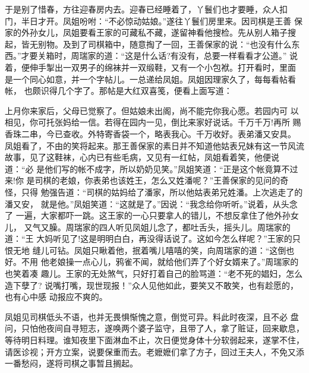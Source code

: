 于是别了惜春，方往迎春房内去。迎春已经睡着了，丫鬟们也才要睡，众人扣
门，半日才开。凤姐吩咐：“不必惊动姑娘。”遂往丫鬟们房里来。因司棋是王善
保家的外孙女儿，凤姐要看王家的可藏私不藏，遂留神看他搜检。先从别人箱子搜
起，皆无别物。及到了司棋箱中，随意掏了一回，王善保家的说：“也没有什么东
西。”才要关箱时，周瑞家的道：“这是什么话?有没有，总要一样看看才公道。”
说着，便伸手掣出一双男子的绵袜并一双缎鞋，又有一个小包袱。打开看时，里面
是一个同心如意，并一个字帖儿。一总递给凤姐。凤姐因理家久了，每每看帖看帐，
也颇识得几个字了。那帖是大红双喜笺，便看上面写道：

上月你来家后，父母已觉察了。但姑娘未出阁，尚不能完你我心愿。若园内可
以相见，你可托张妈给一信。若得在园内一见，倒比来家好说话。千万千万!再所
赐香珠二串，今已查收。外特寄香袋一个，略表我心。千万收好。表弟潘又安具。
凤姐看了，不由的笑将起来。那王善保家的素日并不知道他姑表兄妹有这一节风流
故事，见了这鞋袜，心内已有些毛病，又见有一红帖，凤姐看着笑，他便说道：“必
是他们写的帐不成字，所以奶奶见笑。”凤姐笑道：“正是这个帐竟算不过来!你
是司棋的老娘，你表弟也该姓王，怎么又姓潘呢？”王善保家的见问的奇怪，只得
勉强告道：“司棋的姑妈给了潘家，所以他姑表弟兄姓潘。上次逃走了的潘又安，
就是他。”凤姐笑道：“这就是了。”因说：“我念给你听听。”说着，从头念了
一遍，大家都吓一跳。这王家的一心只要拿人的错儿，不想反拿住了他外孙女儿，
又气又臊。周瑞家的四人听见凤姐儿念了，都吐舌头，摇头儿。周瑞家的道：“王
大妈听见了!这是明明白白，再没得话说了。这如今怎么样呢？”王家的只恨无地
缝儿可钻。凤姐只瞅着他，抿着嘴儿嘻嘻的笑，向周瑞家的道：“这倒也好。不用
他老娘操一点心儿，鸦雀不闻，就给他们弄了个好女婿来了。”周瑞家的也笑着凑
趣儿。王家的无处煞气，只好打着自己的脸骂道：“老不死的娼妇，怎么造下孽了?
说嘴打嘴，现世现报！”众人见他如此，要笑又不敢笑，也有趁愿的，也有心中感
动报应不爽的。

凤姐见司棋低头不语，也并无畏惧惭愧之意，倒觉可异。料此时夜深，且不必
盘问，只怕他夜间自寻短志，遂唤两个婆子监守，且带了人，拿了赃证，回来歇息，
等待明日料理。谁知夜里下面淋血不止，次日便觉身体十分软弱起来，遂掌不住，
请医诊视；开方立案，说要保重而去。老嬷嬷们拿了方子，回过王夫人，不免又添
一番愁闷，遂将司棋之事暂且搁起。

